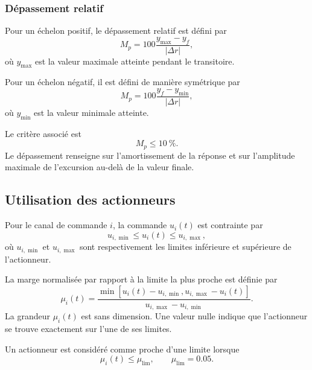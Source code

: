 \documentclass[11pt,a4paper,oneside]{report}
\begin{document}
\subsubsection{Dépassement relatif}

Pour un échelon positif, le dépassement relatif est défini par
\begin{equation}
	M_p
	=
	100
	\frac{
		y_{\max}-y_f
	}{
		|\Delta r|
	},
	\label{eq_positive_overshoot}
\end{equation}
où $y_{\max}$ est la valeur maximale atteinte pendant le transitoire.

Pour un échelon négatif, il est défini de manière symétrique par
\begin{equation}
	M_p
	=
	100
	\frac{
		y_f-y_{\min}
	}{
		|\Delta r|
	},
	\label{eq_negative_overshoot}
\end{equation}
où $y_{\min}$ est la valeur minimale atteinte.

Le critère associé est
\begin{equation}
	M_p\leq\SI{10}{\percent}.
	\label{eq_overshoot_requirement}
\end{equation}
Le dépassement renseigne sur l'amortissement de la réponse et sur l'amplitude maximale de l'excursion au-delà de la valeur finale.

\subsection{Utilisation des actionneurs}

Pour le canal de commande $i$, la commande $u_i(t)$ est contrainte par
\begin{equation}
	u_{i,\min}
	\leq
	u_i(t)
	\leq
	u_{i,\max},
	\label{eq_actuator_limits}
\end{equation}
où $u_{i,\min}$ et $u_{i,\max}$ sont respectivement les limites inférieure et supérieure de l'actionneur.

La marge normalisée par rapport à la limite la plus proche est définie par
\begin{equation}
	\mu_i(t)
	=
	\frac{
		\min\left[
		u_i(t)-u_{i,\min},
		u_{i,\max}-u_i(t)
		\right]
	}{
		u_{i,\max}-u_{i,\min}
	}.
	\label{eq_actuator_normalized_margin}
\end{equation}
La grandeur $\mu_i(t)$ est sans dimension. Une valeur nulle indique que l'actionneur se trouve exactement sur l'une de ses limites.

Un actionneur est considéré comme proche d'une limite lorsque
\begin{equation}
	\mu_i(t)\leq\mu_{\mathrm{lim}},
	\qquad
	\mu_{\mathrm{lim}}=0.05.
	\label{eq_actuator_near_limit}
\end{equation}
\end{document}

